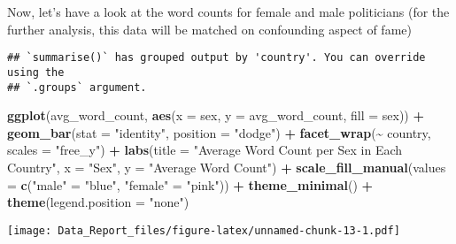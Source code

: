 \documentclass[
]{article}
\newenvironment{Shaded}{\begin{snugshade}}{\end{snugshade}}
\newcommand{\AttributeTok}[1]{\textcolor[rgb]{0.13,0.29,0.53}{#1}}
\newcommand{\CommentTok}[1]{\textcolor[rgb]{0.56,0.35,0.01}{\textit{#1}}}
\newcommand{\FunctionTok}[1]{\textcolor[rgb]{0.13,0.29,0.53}{\textbf{#1}}}
\newcommand{\NormalTok}[1]{#1}
\newcommand{\OtherTok}[1]{\textcolor[rgb]{0.56,0.35,0.01}{#1}}
\newcommand{\SpecialCharTok}[1]{\textcolor[rgb]{0.81,0.36,0.00}{\textbf{#1}}}
\newcommand{\StringTok}[1]{\textcolor[rgb]{0.31,0.60,0.02}{#1}}
\begin{document}
Now, let's have a look at the word counts for female and male
politicians (for the further analysis, this data will be matched on
confounding aspect of fame)

\begin{Shaded}
\end{Shaded}

\begin{verbatim}
## `summarise()` has grouped output by 'country'. You can override using the
## `.groups` argument.
\end{verbatim}

\begin{Shaded}
\begin{Highlighting}[]
\FunctionTok{ggplot}\NormalTok{(avg\_word\_count, }\FunctionTok{aes}\NormalTok{(}\AttributeTok{x =}\NormalTok{ sex, }\AttributeTok{y =}\NormalTok{ avg\_word\_count, }\AttributeTok{fill =}\NormalTok{ sex)) }\SpecialCharTok{+}
  \FunctionTok{geom\_bar}\NormalTok{(}\AttributeTok{stat =} \StringTok{"identity"}\NormalTok{, }\AttributeTok{position =} \StringTok{"dodge"}\NormalTok{) }\SpecialCharTok{+}
  \FunctionTok{facet\_wrap}\NormalTok{(}\SpecialCharTok{\textasciitilde{}}\NormalTok{ country, }\AttributeTok{scales =} \StringTok{"free\_y"}\NormalTok{) }\SpecialCharTok{+}
  \FunctionTok{labs}\NormalTok{(}\AttributeTok{title =} \StringTok{"Average Word Count per Sex in Each Country"}\NormalTok{,}
       \AttributeTok{x =} \StringTok{"Sex"}\NormalTok{,}
       \AttributeTok{y =} \StringTok{"Average Word Count"}\NormalTok{) }\SpecialCharTok{+}
  \FunctionTok{scale\_fill\_manual}\NormalTok{(}\AttributeTok{values =} \FunctionTok{c}\NormalTok{(}\StringTok{"male"} \OtherTok{=} \StringTok{"blue"}\NormalTok{, }\StringTok{"female"} \OtherTok{=} \StringTok{"pink"}\NormalTok{)) }\SpecialCharTok{+}
  \FunctionTok{theme\_minimal}\NormalTok{() }\SpecialCharTok{+}
  \FunctionTok{theme}\NormalTok{(}\AttributeTok{legend.position =} \StringTok{"none"}\NormalTok{)}
\end{Highlighting}
\end{Shaded}

\texttt{[image: Data\_Report\_files/figure-latex/unnamed-chunk-13-1.pdf]}
\end{document}
